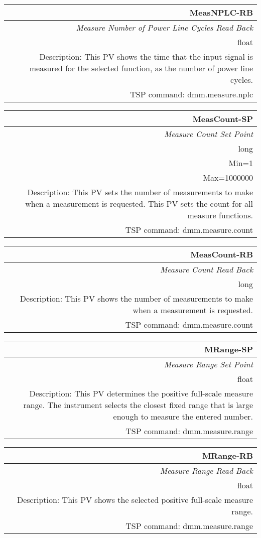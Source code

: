 \documentclass[openany]{article}
\begin{document}
		\begin{tabular}{N}		
			\hline
			\bfseries MeasNPLC-RB\label{pv:measnplc-rb} \\ \hline
			\emph{Measure Number of Power Line Cycles Read Back} \\
			float \\
			Description: This PV shows the time that the input signal is measured for the selected function, as the number of power line cycles. \\
			TSP command: dmm.measure.nplc
		\end{tabular}

		\begin{tabular}{N}
			\hline		
			\bfseries MeasCount-SP\label{pv:meascount-sp} \\ \hline
			\emph{Measure Count Set Point} \\
			long \\
			Min=1 \\
			Max=1000000 \\
			Description: This PV sets the number of measurements to make when a measurement is requested. This PV sets the count for all measure functions. \\
			TSP command: dmm.measure.count
		\end{tabular}

		\begin{tabular}{N}
			\hline
			\bfseries MeasCount-RB\label{pv:meascount-rb} \\ \hline
			\emph{Measure Count Read Back} \\
			long \\
			Description: This PV shows the number of measurements to make when a measurement is requested. \\
			TSP command: dmm.measure.count
		\end{tabular}

		\begin{tabular}{N}
			\hline
			\bfseries MRange-SP\label{pv:mrange-sp} \\ \hline
			\emph{Measure Range Set Point} \\
			float \\
			Description: This PV determines the positive full-scale measure range. The instrument selects the closest fixed range that is large enough to measure the entered number.\\
			TSP command: dmm.measure.range
		\end{tabular}

		\begin{tabular}{N}
			\hline
			\bfseries MRange-RB\label{pv:mrange-rb} \\ \hline
			\emph{Measure Range Read Back} \\
			float \\
			Description: This PV shows the selected positive full-scale measure range. \\
			TSP command: dmm.measure.range
		\end{tabular}
\end{document}
